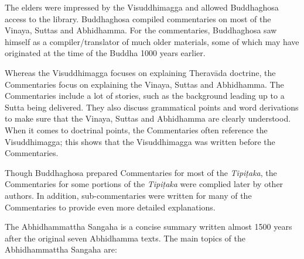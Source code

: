 The elders were impressed by the Visuddhimagga and allowed Buddhaghosa access to the library. Buddhaghosa compiled commentaries on most of the Vinaya, Suttas and Abhidhamma. For the commentaries, Buddhaghosa saw himself as a compiler/translator of much older materials, some of which may have originated at the time of the Buddha 1000 years earlier.

Whereas the Visuddhimagga focuses on explaining Theravāda doctrine, the Commentaries focus on explaining the Vinaya, Suttas and Abhidhamma. The Commentaries include a lot of stories, such as the background leading up to a Sutta being delivered. They also discuss grammatical points and word derivations to make sure that the Vinaya, Suttas and Abhidhamma are clearly understood. When it comes to doctrinal points, the Commentaries often reference the Visuddhimagga; this shows that the Visuddhimagga was written before the Commentaries. 

Though Buddhaghosa prepared Commentaries for most of the \textit{Tipiṭaka}, the Commentaries for some portions of the \textit{Tipiṭaka} were complied later by other authors. In addition, sub-commentaries were written for many of the Commentaries to provide even more detailed explanations.


The Abhidhammattha Sangaha is a concise summary written almost 1500 years after the original seven Abhidhamma texts. The main topics of the Abhidhammattha Sangaha are:

